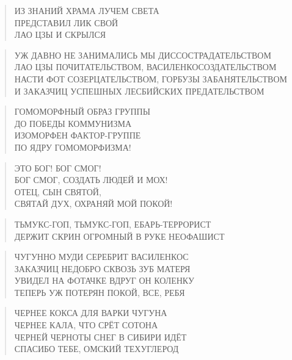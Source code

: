 \poemtitle{***}
\begin{verse}
ИЗ ЗНАНИЙ ХРАМА ЛУЧЕМ СВЕТА\\
ПРЕДСТАВИЛ ЛИК СВОЙ\\
ЛАО ЦЗЫ И СКРЫЛСЯ
\end{verse}

\poemtitle{***}
\begin{verse}
УЖ ДАВНО НЕ ЗАНИМАЛИСЬ МЫ ДИССОСТРАДАТЕЛЬСТВОМ\\
ЛАО ЦЗЫ ПОЧИТАТЕЛЬСТВОМ, ВАСИЛЕНКОСОЗДАТЕЛЬСТВОМ\\
НАСТИ ФОТ СОЗЕРЦАТЕЛЬСТВОМ, ГОРБУЗЫ ЗАБАНЯТЕЛЬСТВОМ\\
И ЗАКАЗЧИЦ УСПЕШНЫХ ЛЕСБИЙСКИХ ПРЕДАТЕЛЬСТВОМ
\end{verse}

\poemtitle{***}
\begin{verse}
ГОМОМОРФНЫЙ ОБРАЗ ГРУППЫ\\
ДО ПОБЕДЫ КОММУНИЗМА\\
ИЗОМОРФЕН ФАКТОР-ГРУППЕ\\
ПО ЯДРУ ГОМОМОРФИЗМА!
\end{verse}

\poemtitle{***}
\begin{verse}
ЭТО БОГ! БОГ СМОГ!\\
БОГ СМОГ, СОЗДАТЬ ЛЮДЕЙ И МОХ!\\
ОТЕЦ, СЫН СВЯТОЙ,\\
СВЯТАЙ ДУХ, ОХРАНЯЙ МОЙ ПОКОЙ!
\end{verse}

\poemtitle{***}
\begin{verse}
ТЬМУКС-ГОП, ТЬМУКС-ГОП, ЕБАРЬ-ТЕРРОРИСТ\\
ДЕРЖИТ СКРИН ОГРОМНЫЙ В РУКЕ НЕОФАШИСТ
\end{verse}

\poemtitle{***}
\begin{verse}
ЧУГУННО МУДИ СЕРЕБРИТ ВАСИЛЕНКОС\\
ЗАКАЗЧИЦ НЕДОБРО СКВОЗЬ ЗУБ МАТЕРЯ\\
УВИДЕЛ НА ФОТАЧКЕ ВДРУГ ОН КОЛЕНКУ\\
ТЕПЕРЬ УЖ ПОТЕРЯН ПОКОЙ, ВСЕ, РЕБЯ
\end{verse}

\poemtitle{***}
\begin{verse}
ЧЕРНЕЕ КОКСА ДЛЯ ВАРКИ ЧУГУНА\\
ЧЕРНЕЕ КАЛА, ЧТО СРЁТ СОТОНА\\
ЧЕРНЕЙ ЧЕРНОТЫ СНЕГ В СИБИРИ ИДЁТ\\
СПАСИБО ТЕБЕ, ОМСКИЙ ТЕХУГЛЕРОД
\end{verse}

